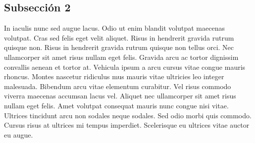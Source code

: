 \subsection{Subsección 2}

In iaculis nunc sed augue lacus. Odio ut enim blandit volutpat maecenas volutpat. Cras sed felis eget velit aliquet. Risus in hendrerit gravida rutrum quisque non. Risus in hendrerit gravida rutrum quisque non tellus orci. Nec ullamcorper sit amet risus nullam eget felis. Gravida arcu ac tortor dignissim convallis aenean et tortor at. Vehicula ipsum a arcu cursus vitae congue mauris rhoncus. Montes nascetur ridiculus mus mauris vitae ultricies leo integer malesuada. Bibendum arcu vitae elementum curabitur. Vel risus commodo viverra maecenas accumsan lacus vel. Aliquet nec ullamcorper sit amet risus nullam eget felis. Amet volutpat consequat mauris nunc congue nisi vitae. Ultrices tincidunt arcu non sodales neque sodales. Sed odio morbi quis commodo. Cursus risus at ultrices mi tempus imperdiet. Scelerisque eu ultrices vitae auctor eu augue.\\